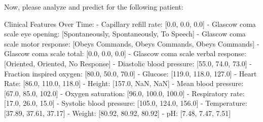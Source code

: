 \begin{tcolorbox}[colback=cadmiumgreen!5!white,colframe=forestgreen!75!white,breakable,title=\textit{Basic setting prompt template of optimized with in-context for the mortality prediction task on the MIMIC-IV.}]
\begin{VerbatimWrap}
Now, please analyze and predict for the following patient:

Clinical Features Over Time:
- Capillary refill rate: [0.0, 0.0, 0.0]
- Glascow coma scale eye opening: [Spontaneously, Spontaneously, To Speech]
- Glascow coma scale motor response: [Obeys Commands, Obeys Commands, Obeys Commands]
- Glascow coma scale total: [0.0, 0.0, 0.0]
- Glascow coma scale verbal response: [Oriented, Oriented, No Response]
- Diastolic blood pressure: [55.0, 74.0, 73.0]
- Fraction inspired oxygen: [80.0, 50.0, 70.0]
- Glucose: [119.0, 118.0, 127.0]
- Heart Rate: [86.0, 110.0, 118.0]
- Height: [157.0, NaN, NaN]
- Mean blood pressure: [67.0, 85.0, 102.0]
- Oxygen saturation: [96.0, 100.0, 100.0]
- Respiratory rate: [17.0, 26.0, 15.0]
- Systolic blood pressure: [105.0, 124.0, 156.0]
- Temperature: [37.89, 37.61, 37.17]
- Weight: [80.92, 80.92, 80.92]
- pH: [7.48, 7.47, 7.51]
\end{VerbatimWrap}
\end{tcolorbox}





